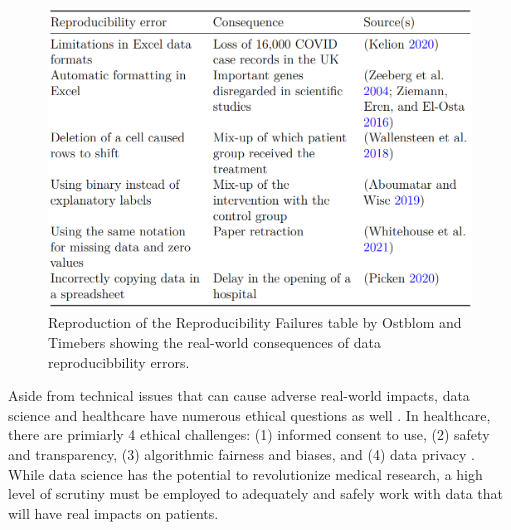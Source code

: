 \documentclass[../main.tex]{subfiles}
\begin{document}
    \begin{figure}[!hbtp]
        \centering
        \includegraphics[scale=0.5]{figs/050-intro/ostblom_timbers-reproducibility_failures.PNG}
        \caption[Reproduction of Reproduciblity Failures]{
        Reproduction of the Reproducibility Failures table
        by Ostblom and Timebers \cite{ostblomOpinionatedPracticesTeaching2021}
        showing the real-world consequences of data reproducibbility errors.
        }
        \label{fig:reproducibility_failures}
    \end{figure}

    Aside from technical issues that can cause adverse real-world impacts, data
    science and healthcare have numerous ethical questions as well
    \cite{gerkeEthicalLegalChallenges2020, peekThirtyYearsArtificial2015,
    phannonstanford.eduResearchersSayUse, rigbyEthicalDimensionsUsing2019,
    wetsmanWHOOutlinesPrinciples2021}.
    In healthcare, there are primiarly 4 ethical challenges:
    (1) informed consent to use,
    (2) safety and transparency,
    (3) algorithmic fairness and biases, and
    (4) data privacy
    \cite{gerkeEthicalLegalChallenges2020}.
    While data science has the potential to revolutionize medical research,
    a high level of scrutiny must be employed to adequately and safely work with
    data that will have real impacts on patients.









\end{document}
